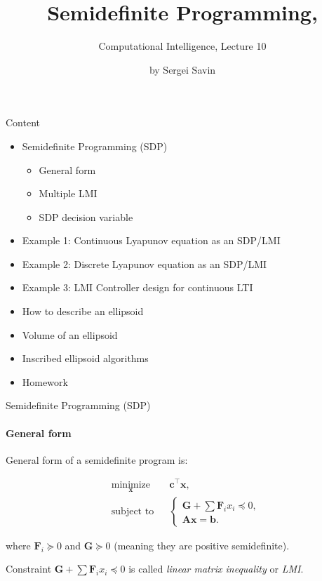 \documentclass{beamer}
\title{Semidefinite Programming, }
\subtitle{Computational Intelligence, Lecture 10}
\author{by Sergei Savin}
\date{\mydate}
\begin{document}
\maketitle


\begin{frame}{Content}

\begin{itemize}
\item  Semidefinite Programming (SDP)
\begin{itemize}
    \item General form
    \item Multiple LMI
    \item SDP decision variable
\end{itemize}
\item  Example 1:  Continuous Lyapunov equation as an SDP/LMI
\item  Example 2:  Discrete Lyapunov equation as an SDP/LMI
\item  Example 3:  LMI Controller design for continuous LTI
\item How to describe an ellipsoid
\item Volume of an ellipsoid
\item Inscribed ellipsoid algorithms
\item Homework
\end{itemize}
\end{frame}



\begin{frame}{Semidefinite Programming (SDP)}
\framesubtitle{General form}
\begin{flushleft}

General form of a semidefinite program is:

%
\begin{equation}
\begin{aligned}
& \underset{\mathbf{x}}{\text{minimize}}
& & \mathbf{c}^\top\mathbf{x}, \\
& \text{subject to}
& & \begin{cases}
    \mathbf{G} + \sum \mathbf{F}_i x_i \preceq 0, \\
    \mathbf{A}\mathbf{x} = \mathbf{b}.
    \end{cases}
\end{aligned}
\end{equation}

where $\mathbf{F}_i \succeq 0$ and $\mathbf{G} \succeq 0$ (meaning they are positive semidefinite).

\bigskip

Constraint $\mathbf{G} + \sum \mathbf{F}_i x_i \preceq 0$ is called \emph{linear matrix inequality} or \emph{LMI}.
 
\end{flushleft}
\end{frame}
\end{document}
